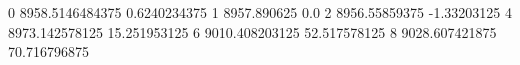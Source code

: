 0 8958.5146484375 0.6240234375
1 8957.890625 0.0
2 8956.55859375 -1.33203125
4 8973.142578125 15.251953125
6 9010.408203125 52.517578125
8 9028.607421875 70.716796875
